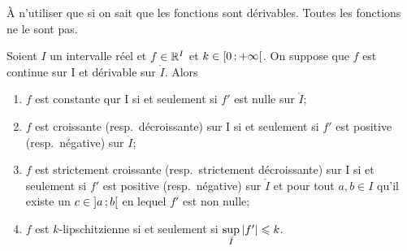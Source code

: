 À n'utiliser que si on sait que les fonctions sont dérivables. Toutes les fonctions ne le sont pas.

\begin{theo}
  Soient \(I\) un intervalle réel et \(f \in \mathbb{R}^I\) et \(k \in \left[ 0 \, ;  +\infty \right[\). On suppose que \(f\) est continue sur I et dérivable sur \(\mathring{I}\). Alors
  \begin{enumerate}
  \item \(f\) est constante qur I si et seulement si \(f'\) est nulle sur \(\mathring{I}\);
  \item \(f\) est croissante (resp.\ décroissante) sur I si et seulement si \(f'\) est positive (resp.\ négative) sur \(\mathring{I}\);
  \item \(f\) est strictement croissante (resp.\ strictement décroissante) sur I si et seulement si \(f'\) est positive (resp.\ négative) sur \(\mathring{I}\) et pour tout \(a,b \in I\) qu'il existe un \(c \in \left] a \, ;  b \right[\) en lequel \(f'\) est non nulle;
  \item \(f\) est \(k\)-lipschitzienne si et seulement si \(\sup\limits_{\mathring{I}} \left\lvert f'\right\rvert \leqslant k\).
  \end{enumerate}
\end{theo}

